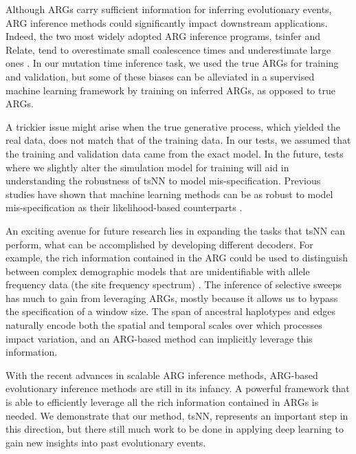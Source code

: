 Although ARGs carry sufficient information for inferring evolutionary events,
ARG inference methods could significantly impact downstream applications.
Indeed, the two most widely adopted ARG inference programs, tsinfer and Relate, tend to overestimate small coalescence times and underestimate large ones \citep{y_c_brandt_evaluation_2022}.
In our mutation time inference task, we used the true ARGs for training and validation,
but some of these biases can be alleviated in a supervised machine learning framework by training on inferred ARGs, as opposed to true ARGs.

A trickier issue might arise when the true generative process, which yielded the real data, does not match that of the training data.
In our tests, we assumed that the training and validation data came from the exact model.
In the future, tests where we slightly alter the simulation model for training will aid in understanding the robustness of tsNN to model mis-specification.
Previous studies have shown that machine learning methods can be as robust to model mis-specification as their likelihood-based counterparts \citep{hejase_deep-learning_2022}.

An exciting avenue for future research lies in expanding the tasks that tsNN can perform, 
what can be accomplished by developing different decoders.
For example, the rich information contained in the ARG could be used to distinguish between complex demographic models that are unidentifiable with allele frequency data (\eg the site frequency spectrum) \citep{schraiber_methods_2015, fan_likelihood-based_2023}.
The inference of selective sweeps has much to gain from leveraging ARGs,
mostly because it allows us to bypass the specification of a window size.
The span of ancestral haplotypes and edges naturally encode both the spatial and temporal scales over which processes impact variation,
and an ARG-based method can implicitly leverage this information.

With the recent advances in scalable ARG inference methods, 
ARG-based evolutionary inference methods are still in its infancy.
A powerful framework that is able to efficiently leverage all the rich information contained in ARGs is needed.
We demonstrate that our method, tsNN, represents an important step in this direction,
but there still much work to be done in applying deep learning to gain new insights into past evolutionary events.

